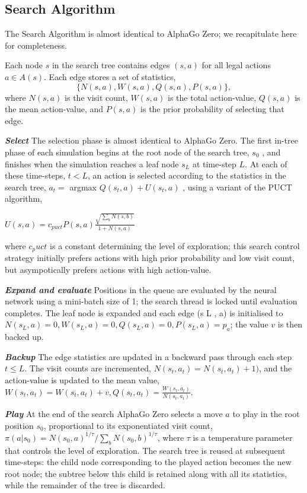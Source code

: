 \documentclass[12pt,a4paper]{article}
\begin{document}
\subsection{Search Algorithm}
\hspace{0.6cm}The Search Algorithm is almost identical to AlphaGo Zero\cite{AlphaGoZero}; we recapitulate
here for completeness.\par 
Each node \(s\) in the search tree contains edges \((s, a)\) for all legal actions \(a \in A(s)\). Each edge stores a set of statistics, \[\{N(s, a), W(s, a), Q(s, a), P(s, a)\},\] where \(N(s, a)\) is the visit count, \(W(s, a)\) is the total action-value, \(Q(s, a)\) is the mean action-value, and \(P(s, a)\) is the prior probability of selecting that edge. \par
\hspace{0.6cm}\textit{\textbf{Select}} The selection phase is almost identical to AlphaGo Zero. The first in-tree phase of each simulation begins at the root node of the search tree, \(s_0\) , and finishes when the simulation reaches a leaf node \(s_L\) at time-step \(L\). At each of these time-steps, \(t < L\), an action is selected according to the statistics in the search tree, \(a_t =\) argmax \(Q(s_t, a) + U (s_t , a)\) , using a variant of the PUCT algorithm, 
\begin{center}\(U(s,a) = c_{puct}P(s,a)\frac{\sqrt{\sum_b N(s,b)}}{1+N(s,a)} \)\end{center}\par
where \(c_puct\) is a constant determining the level of exploration; this search control strategy initially prefers actions with high prior probability and low visit count, but asympotically prefers actions with high action-value.\par
\textit{\textbf{Expand and evaluate}} Positions in the queue are evaluated by the neural network using a mini-batch size of 1; the search thread is locked until evaluation completes. The leaf node is expanded and each edge (s L , a) is initialised to \({N(s_L, a) = 0, W(s_L , a) = 0, Q(s_L , a) = 0, P (s_L , a) = p_a }\); the value \(v\) is then backed up.\par
\textit{\textbf{Backup}} The edge statistics are updated in a backward pass through each step \(t \leq L\). The visit counts are incremented, \(N(s_t , a_t ) = N(s_t , a_t ) + 1)\), and the action-value is updated to the mean value, \(W(s_t , a_t ) = W(s_t , a_t) + v, Q(s_t , a_t) =\frac{W(s_t ,a_t)}{N(s_t ,a_t)}\).\par
\textit{\textbf{Play}} At the end of the search AlphaGo Zero selects a move \(a\) to play in the root position \(s_0\), proportional to its exponentiated visit count, \(\pi(a|s_0 ) = N(s_0,a)^{1/\tau} /\sum_b N (s_0 , b)^{1/\tau}\), where \(\tau\) is a temperature parameter that controls the level of exploration. The search tree is reused at subsequent time-steps: the child node corresponding to the played action becomes the new root node; the subtree below this child is retained along with all its statistics, while the remainder of the tree is discarded.
\end{document}
